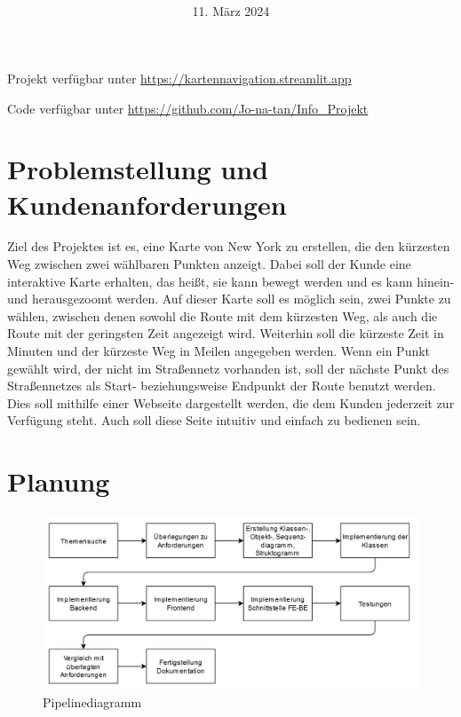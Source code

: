 \documentclass[a4paper,12pt,ngerman]{scrartcl}
\title{\textbf{\Huge\Aufgabe}}
\author{\LARGE \Namen\\\\}
\date{\LARGE11. März 2024}
\begin{document}
\maketitle
\tableofcontents

\vspace{1cm}

Projekt verfügbar unter \url{https://kartennavigation.streamlit.app}

Code verfügbar unter \url{https://github.com/Jo-na-tan/Info_Projekt}

\section{Problemstellung und Kundenanforderungen}
Ziel des Projektes ist es, eine Karte von New York zu erstellen, die den kürzesten Weg zwischen zwei wählbaren Punkten anzeigt. Dabei soll der Kunde eine interaktive Karte erhalten, das heißt, sie kann bewegt werden und es kann hinein- und herausgezoomt werden. Auf dieser Karte soll es möglich sein, zwei Punkte zu wählen, zwischen denen sowohl die Route mit dem kürzesten Weg, als auch die Route mit der geringsten Zeit angezeigt wird. Weiterhin soll die kürzeste Zeit in Minuten und der kürzeste Weg in Meilen angegeben werden. Wenn ein Punkt gewählt wird, der nicht im Straßennetz vorhanden ist, soll der nächste Punkt des Straßennetzes als Start- beziehungsweise Endpunkt der Route benutzt werden. Dies soll mithilfe einer Webseite dargestellt werden, die dem Kunden jederzeit zur Verfügung steht. Auch soll diese Seite intuitiv und einfach zu bedienen sein.

\newpage
\section{Planung}
\begin{figure}[!ht]
  \center
  \includegraphics[width=\textwidth]{Pipelinediagramm.png}
  \vspace{-.5cm}
  \caption{Pipelinediagramm}
\end{figure}
\end{document}
